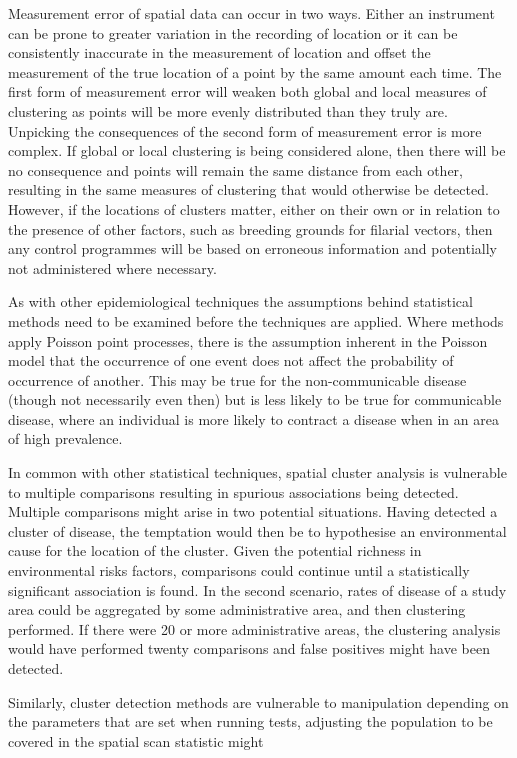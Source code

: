 \documentclass[11pt,a4paper]{article}
\begin{document}
Measurement error of spatial data can occur in two ways. 
Either an instrument can be prone to greater variation in the recording of location or it can be consistently inaccurate in the measurement of location and offset the measurement of the true location of a point by the same amount each time. 
The first form of measurement error will weaken both global and local measures of clustering as points will be more evenly distributed than they truly are. 
Unpicking the consequences of the second form of measurement error is more complex. 
If global or local clustering is being considered alone, then there will be no consequence and points will remain the same distance from each other, resulting in the same measures of clustering that would otherwise be detected.
However, if the locations of clusters matter, either on their own or in relation to the presence of other factors, such as breeding grounds for filarial vectors, then any control programmes will be based on erroneous information and potentially not administered where necessary. 

As with other epidemiological techniques the assumptions behind statistical methods need to be examined before the techniques are applied. 
Where methods apply Poisson point processes, there is the assumption inherent in the Poisson model that the occurrence of one event does not affect the probability of occurrence of another. 
This may be true for the non-communicable disease (though not necessarily even then) but is less likely to be true for communicable disease, where an individual is more likely to contract a disease when in an area of high prevalence. \cite{Kirkwood2003}

In common with other statistical techniques, spatial cluster analysis is vulnerable to  multiple comparisons resulting in spurious associations being detected. \cite{Olsen1996}
Multiple comparisons might arise in two potential situations. 
Having detected a cluster of disease, the temptation would then be to hypothesise an environmental cause for the location of the cluster. 
Given the potential richness in environmental risks factors, comparisons could continue until a statistically significant association is found. 
In the second scenario, rates of disease of a study area could be aggregated by some administrative area, and then clustering performed. 
If there were 20 or more administrative areas, the clustering analysis would have performed twenty comparisons and false positives might have been detected. 

Similarly, cluster detection methods are vulnerable to manipulation depending on the parameters that are set when running tests, adjusting the population to be covered in the spatial scan statistic might 
\end{document}
